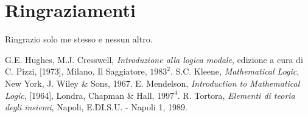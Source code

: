 \documentclass[a4paper, titlepage, 12pt]{report}
\begin{document}
\chapter*{Ringraziamenti}
Ringrazio solo me stesso e nessun altro.

\begin{thebibliography}{5}
 G.E. Hughes, M.J. Cresswell, \textit{Introduzione alla logica modale},
edizione a cura di C. Pizzi, [1973], Milano, Il Saggiatore, $1983^{2}$.
 S.C. Kleene, \textit{Mathematical Logic}, New York, J. Wiley \& Sons, 1967.
 E. Mendelson, \textit{Introduction to Mathematical Logic}, [1964], Londra, Chapman \& Hall, $1997^{4}$.
 R. Tortora, \textit{Elementi di teoria degli insiemi}, Napoli, E.DI.S.U. - Napoli 1, 1989.
\end{thebibliography}
\end{document}
